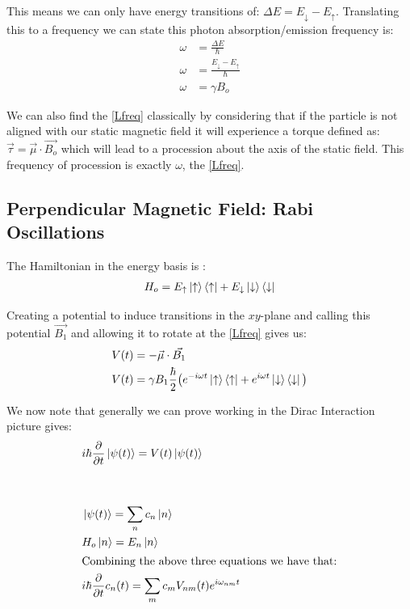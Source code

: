 This means we can only have energy transitions of: $\Delta E  = E_\downarrow - E_\uparrow $. Translating this to a frequency we can state this photon absorption/emission frequency is:
\begin{align}
    \omega &= \frac{\Delta E}{\hbar} \nonumber \\
    \omega &= \frac{E_\downarrow - E_\uparrow}{\hbar}  \nonumber \\
    \omega &= \gamma B_o \tag{Larmor frequency}\label{Lfreq}
\end{align}

We can also find the \ref{Lfreq} classically by considering that if the particle is not aligned with our static magnetic field it will experience a torque defined as: $\vec{\tau} = \vec{\mu} \cdot \vec{B_o}$ which will lead to a procession about the axis of the static field. This frequency of procession is exactly $\omega$, the \ref{Lfreq}. \clearpage

\subsection{Perpendicular Magnetic Field: Rabi Oscillations}

The Hamiltonian in the energy basis is :
\begin{align}
    H_o = E_\uparrow \ket{\uparrow} \bra{\uparrow} + E_\downarrow \ket{\downarrow} \bra{\downarrow} \label{H_energy}
\end{align}

Creating a potential to induce transitions in the $xy$-plane and calling this potential $\vec{B_1}$ and allowing it to rotate at the \ref{Lfreq} gives us:
\begin{align*}
    V(t) &= -\vec{\mu} \cdot \vec{B_1}\\
    V(t) & = \gamma B_1 \frac{\hbar}{2} \big{(} e^{-i \omega t } \ket{\uparrow} \bra{\uparrow} + e^{i \omega t } \ket{\downarrow} \bra{\downarrow} \big{)}\\
\end{align*}

We now note that generally we can prove working in the Dirac Interaction picture gives:
\begin{align*}
   & i \hbar \frac{\partial}{\partial t} \ket{\psi (t)} = V(t) \ket{\psi (t)} \\[2em]
   \intertext{%
   }
   & \ket{\psi (t)} = \sum_n c_n \ket{n} & \ \\
    & H_o \ket{n} = E_n \ket{n}\\ 
    \intertext{Combining the above three equations we have that:} 
    &  i \hbar \frac{\partial}{\partial t} c_n (t) = \sum_m c_m V_{nm}(t) e^{i \omega_{nm} t}
\end{align*}

